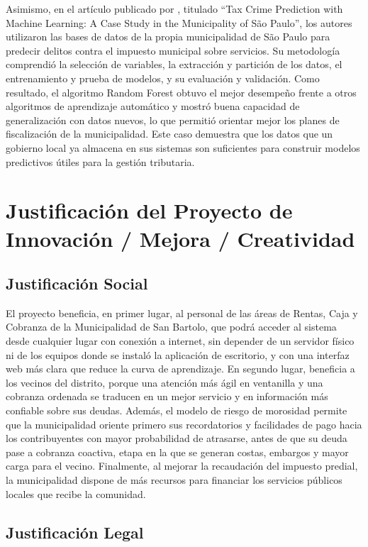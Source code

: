 \documentclass[12pt,a4paper]{report}
\begin{document}
Asimismo, en el artículo publicado por \textcite{ippolito2020}, titulado ``Tax Crime Prediction with Machine Learning: A Case Study in the Municipality of São Paulo'', los autores utilizaron las bases de datos de la propia municipalidad de São Paulo para predecir delitos contra el impuesto municipal sobre servicios. Su metodología comprendió la selección de variables, la extracción y partición de los datos, el entrenamiento y prueba de modelos, y su evaluación y validación. Como resultado, el algoritmo Random Forest obtuvo el mejor desempeño frente a otros algoritmos de aprendizaje automático y mostró buena capacidad de generalización con datos nuevos, lo que permitió orientar mejor los planes de fiscalización de la municipalidad. Este caso demuestra que los datos que un gobierno local ya almacena en sus sistemas son suficientes para construir modelos predictivos útiles para la gestión tributaria.

\section{Justificación del Proyecto de Innovación / Mejora / Creatividad}

\subsection{Justificación Social}

El proyecto beneficia, en primer lugar, al personal de las áreas de Rentas, Caja y Cobranza de la Municipalidad de San Bartolo, que podrá acceder al sistema desde cualquier lugar con conexión a internet, sin depender de un servidor físico ni de los equipos donde se instaló la aplicación de escritorio, y con una interfaz web más clara que reduce la curva de aprendizaje. En segundo lugar, beneficia a los vecinos del distrito, porque una atención más ágil en ventanilla y una cobranza ordenada se traducen en un mejor servicio y en información más confiable sobre sus deudas. Además, el modelo de riesgo de morosidad permite que la municipalidad oriente primero sus recordatorios y facilidades de pago hacia los contribuyentes con mayor probabilidad de atrasarse, antes de que su deuda pase a cobranza coactiva, etapa en la que se generan costas, embargos y mayor carga para el vecino. Finalmente, al mejorar la recaudación del impuesto predial, la municipalidad dispone de más recursos para financiar los servicios públicos locales que recibe la comunidad.

\subsection{Justificación Legal}
\end{document}
